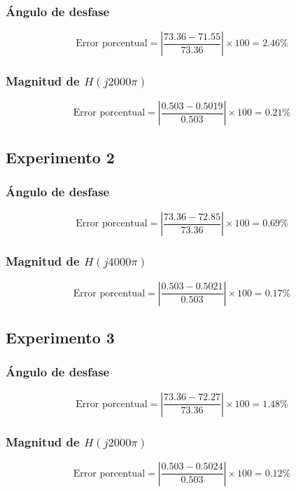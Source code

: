 \documentclass[12pt, letterpaper]{article}
\begin{document}
\subsubsection*{Ángulo de desfase}

\[\text{Error porcentual} = \left|\frac{73.36 - 71.55}{73.36}\right| \times 100 = 2.46\%\]

\subsubsection*{Magnitud de \(H(j2000\pi)\)}

\[\text{Error porcentual} = \left|\frac{0.503 - 0.5019}{0.503}\right| \times 100 = 0.21\%\]

\subsection*{Experimento 2}

\subsubsection*{Ángulo de desfase}

\[\text{Error porcentual} = \left|\frac{73.36 - 72.85}{73.36}\right| \times 100 = 0.69\%\]

\subsubsection*{Magnitud de \(H(j4000\pi)\)}

\[\text{Error porcentual} = \left|\frac{0.503 - 0.5021}{0.503}\right| \times 100 = 0.17\%\]

\subsection*{Experimento 3}

\subsubsection*{Ángulo de desfase}

\[\text{Error porcentual} = \left|\frac{73.36 - 72.27}{73.36}\right| \times 100 = 1.48\%\]

\subsubsection*{Magnitud de \(H(j2000\pi)\)}

\[\text{Error porcentual} = \left|\frac{0.503 - 0.5024}{0.503}\right| \times 100 = 0.12\%\]
\end{document}
